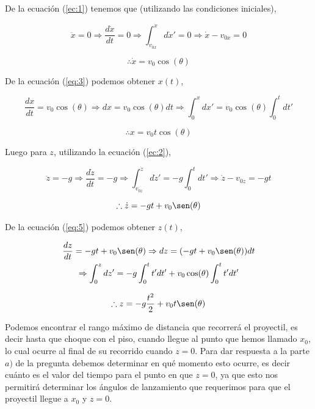 \documentclass[a4paper,10pt]{article}
\begin{document}
De la ecuación (\ref{ec:1}) tenemos que (utilizando las condiciones iniciales),

\begin{equation*}
 \ddot{x} = 0 \Rightarrow \frac{d\dot{x}}{dt} = 0 \Rightarrow 
 \int_{v_{0x}}^{\dot{x}}d\dot{x}' = 0 \Rightarrow \dot{x} - v_{0x} = 0 
 \end{equation*}

\begin{equation}
 \therefore \dot{x} = v_0 \cos(\theta)
 \label{eq:3}
\end{equation}

De la ecuación (\ref{eq:3}) podemos obtener $x(t)$, 

\begin{equation*}
 \frac{dx}{dt} = v_0 \cos(\theta) \Rightarrow dx = v_0 \cos(\theta) dt \Rightarrow
 \int_0^x dx' = v_0 \cos(\theta) \int_0^t dt'
\end{equation*}

\begin{equation}
 \therefore x = v_0 t \cos(\theta)
 \label{eq:4}
\end{equation}

Luego para $z$, utilizando la ecuación (\ref{ec:2}),

\begin{equation*}
 \ddot{z} = -g \Rightarrow \frac{d\dot{z}}{dt} = -g \Rightarrow 
 \int_{v_{0z}}^{\dot{z}}d\dot{z}' = -g \int_0^t dt' \Rightarrow \dot{z} - v_{0z} = -gt 
 \end{equation*}
 
\begin{equation}
 \therefore \dot{z} = -gt + v_0 \sen(\theta)
 \label{eq:5}
\end{equation}

De la ecuación (\ref{eq:5}) podemos obtener $z(t)$,

\begin{gather*}
 \frac{dz}{dt} = -gt + v_0 \sen(\theta) \Rightarrow dz = (-gt + v_0 \sen(\theta)) dt \\ \Rightarrow
 \int_0^z dz' = -g\int_0^t t' dt' + v_0 \cos(\theta) \int_0^t t'dt'
\end{gather*}

\begin{equation}
 \therefore z = - g \frac{t^2}{2} + v_0 t \sen(\theta)
 \label{eq:6}
\end{equation}

Podemos encontrar el rango máximo de distancia que recorrerá el proyectil, 
es decir hasta que choque con el piso, cuando llegue al punto que hemos llamado
$x_0$, lo cual ocurre al final de su recorrido cuando $z=0$. Para dar
respuesta a la parte $a)$ de la pregunta debemos determinar en qué momento
esto ocurre, es decir cuánto es el valor del tiempo para el punto en que 
$z=0$, ya que esto nos permitirá determinar los ángulos de lanzamiento
que requerimos para que el proyectil llegue a $x_0$ y $z=0$.
\end{document}

